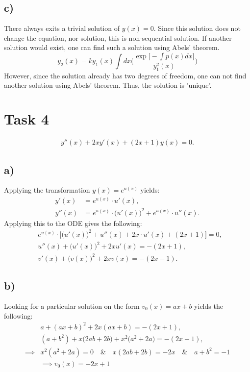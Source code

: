 \documentclass[]{article}
\begin{document}
\subsection*{c)} There always exits a trivial solution of $y(x) = 0$. Since this solution does not change the equation, nor solution, this is non-sequential solution. If another solution would exist, one can find such a solution using Abels' theorem.
\begin{equation}
    y_2(x) = k y_1(x) \int dx\Bigg( \frac{\exp\Big[-\int p(x)dx\Big]}{y_1^2(x)}\Bigg)
\end{equation}
However, since the solution already has two degrees of freedom, one can not find another solution using Abels' theorem. Thus, the solution is 'unique'.

\section*{Task 4}
\begin{align*}
    y''(x) +2xy'(x) + (2x+1)y(x) = 0.
\end{align*}
\subsection*{a)}
Applying the transformation $y(x) = e^{u(x)}$ yields:
\begin{align*}
    y'(x) &= e^{u(x)}\cdot u'(x),\\
    y''(x)&=e^{u(x)}\cdot \big( u'(x)\big)^2 + e^{u(x)}\cdot u''(x).
\end{align*}Applying this to the ODE gives the following:
\begin{align*}
    &e^{u(x)}\cdot\Bigg[ \big( u'(x)\big)^2 +  u''(x) + 2x\cdot u'(x) + (2x+1)\Bigg] = 0,\\
    &u''(x) + \Big(u'(x)\Big)^2+ 2xu'(x) = -(2x + 1),\\
    &v'(x) + \Big(v(x)\Big)^2 + 2xv(x) = -(2x + 1).
\end{align*}

\subsection*{b)}
Looking for a particular solution on the form $v_0(x) = ax + b$ yields the following:
\begin{align*}
    &a + (ax + b)^2 + 2x(ax + b) = -(2x + 1),\\
    &(a + b^2) + x\big(2ab + 2b\big) + x^2\big(a^2 + 2a\Big) = -(2x + 1),\\
    \implies & x^2(a^2 + 2a) = 0\quad \& \quad x(2ab + 2b) = -2x\quad \& \quad a + b^2 = - 1\\
    &\implies  v_0(x) = -2x +1
\end{align*}
\end{document}
